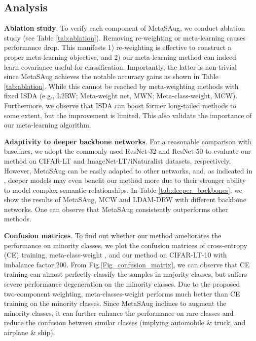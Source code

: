 \subsection{Analysis}
\label{ablation study}
\textbf{Ablation study}. To verify each component of MetaSAug, we conduct ablation study (see Table \ref{tab:ablation}). Removing re-weighting or meta-learning causes performance drop. This manifests 1) re-weighting is effective to construct a proper meta-learning objective, and 2) our meta-learning method can indeed learn covariance useful for classification. Importantly, the latter is non-trivial since MetaSAug achieves the notable accuracy gains as shown in Table \ref{tab:ablation}. While this cannot be reached by meta-weighting methods with fixed ISDA (e.g., L2RW; Meta-weight net, MWN; Meta-class-weight, MCW). Furthermore, we observe that ISDA can boost former long-tailed methods to some extent, but the improvement is limited. This also validate the importance of our meta-learning algorithm.


\textbf{Adaptivity to deeper backbone networks}. For a reasonable comparison with baselines, we adopt the commonly used ResNet-32 and ResNet-50 to evaluate our method on CIFAR-LT and ImageNet-LT/iNaturalist datasets, respectively. However, MetaSAug can be easily adapted to other networks, and, as indicated in \cite{ISDA}, deeper models may even benefit our method more due to their stronger ability to model complex semantic relationships. In Table \ref{tab:deeper_backbones}, we show the results of MetaSAug, MCW \cite{jamal2020rethinking} and LDAM-DRW \cite{cao2019learning} with different backbone networks. One can observe that MetaSAug consistently outperforms other methods.

\textbf{Confusion matrices}. To find out whether our method ameliorates the performance on minority classes, we plot the confusion matrices of cross-entropy (CE) training, meta-class-weight \cite{jamal2020rethinking}, and our method on CIFAR-LT-10 with imbalance factor 200. From Fig.\ref{Fig_confusion_matrix}, we can observe that CE training can almost perfectly classify the samples in majority classes, but suffers severe performance degeneration on the minority classes. Due to the proposed two-component weighting, meta-classes-weight performs much better than CE training on the minority classes. Since MetaSAug inclines to augment the minority classes, it can further enhance the performance on rare classes and reduce the confusion between similar classes (implying automobile \& truck, and airplane \& ship).


